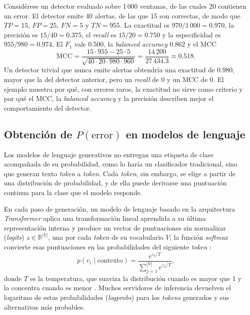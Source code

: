 Considérese un detector evaluado sobre 1\,000 ventanas, de las cuales 20 contienen un error. El detector emite 40 alertas, de las que 15 son correctas, de modo que $TP = 15$, $FP = 25$, $FN = 5$ y $TN = 955$. La exactitud es $970/1\,000 = 0.970$, la precisión es $15/40 = 0.375$, el \textit{recall} es $15/20 = 0.750$ y la especificidad es $955/980 = 0.974$. El $F_1$ vale $0.500$, la \textit{balanced accuracy} $0.862$ y el MCC
\begin{equation}
\mathrm{MCC} = \frac{15 \cdot 955 - 25 \cdot 5}{\sqrt{40 \cdot 20 \cdot 980 \cdot 960}} = \frac{14\,200}{27\,434.3} \approx 0.518.
\end{equation}
Un detector trivial que nunca emite alertas obtendría una exactitud de $0.980$, mayor que la del detector anterior, pero un \textit{recall} de 0 y un MCC de 0. El ejemplo muestra por qué, con errores raros, la exactitud no sirve como criterio y por qué el MCC, la \textit{balanced accuracy} y la precisión describen mejor el comportamiento del detector.

\subsection{Obtención de $P(\text{error})$ en modelos de lenguaje}\label{sec:mt_probabilidad}

Los modelos de lenguaje generativos no entregan una etiqueta de clase acompañada de su probabilidad, como lo haría un clasificador tradicional, sino que generan texto \textit{token} a \textit{token}. Cada \textit{token}, sin embargo, se elige a partir de una distribución de probabilidad, y de ella puede derivarse una puntuación continua para la clase que el modelo responde.

En cada paso de generación, un modelo de lenguaje basado en la arquitectura \textit{Transformer} aplica una transformación lineal aprendida a su última representación interna y produce un vector de puntuaciones sin normalizar (\textit{logits}) $z \in \mathbb{R}^{|V|}$, una por cada \textit{token} de su vocabulario $V$; la función \textit{softmax} convierte esas puntuaciones en las probabilidades del siguiente \textit{token} \cite{vaswani2017_attention}:
\begin{equation}
p(v_i \mid \text{contexto}) = \frac{e^{z_i / T}}{\sum_{j=1}^{|V|} e^{z_j / T}},
\end{equation}
donde $T$ es la temperatura, que suaviza la distribución cuando es mayor que 1 y la concentra cuando es menor \cite{yang2025_lightweight}. Muchos servidores de inferencia devuelven el logaritmo de estas probabilidades (\textit{logprobs}) para los \textit{tokens} generados y sus alternativas más probables.

